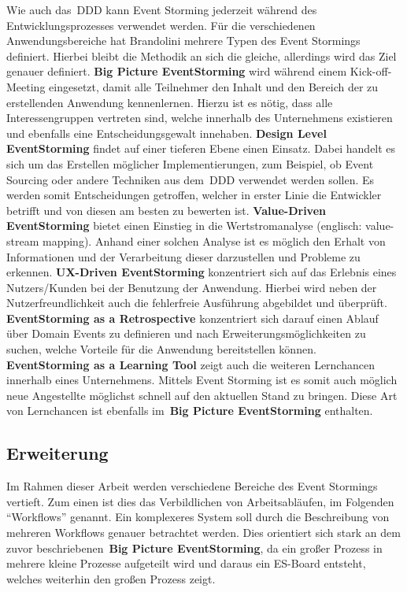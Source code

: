 Wie auch das~\ac{DDD} kann Event Storming jederzeit während des Entwicklungsprozesses verwendet werden.
Für die verschiedenen Anwendungsbereiche hat Brandolini mehrere Typen des Event Stormings definiert\cite*{introES}.
Hierbei bleibt die Methodik an sich die gleiche, allerdings wird das Ziel genauer definiert.\newline
\textbf{Big Picture EventStorming} wird während einem Kick-off-Meeting eingesetzt, damit alle Teilnehmer den Inhalt und den Bereich der zu erstellenden Anwendung kennenlernen.
Hierzu ist es nötig, dass alle Interessengruppen vertreten sind, welche innerhalb des Unternehmens existieren und ebenfalls eine Entscheidungsgewalt innehaben.\newline
\textbf{Design Level EventStorming} findet auf einer tieferen Ebene einen Einsatz.
Dabei handelt es sich um das Erstellen möglicher Implementierungen, zum Beispiel, ob Event Sourcing oder andere Techniken aus dem~\ac{DDD} verwendet werden sollen.
Es werden somit Entscheidungen getroffen, welcher in erster Linie die Entwickler betrifft und von diesen am besten zu bewerten ist.\newline
\textbf{Value-Driven EventStorming} bietet einen Einstieg in die Wertstromanalyse (englisch: value-stream mapping).
Anhand einer solchen Analyse ist es möglich den Erhalt von Informationen und der Verarbeitung dieser darzustellen und Probleme zu erkennen.\newline
\textbf{UX-Driven EventStorming} konzentriert sich auf das Erlebnis eines Nutzers/Kunden bei der Benutzung der Anwendung.
Hierbei wird neben der Nutzerfreundlichkeit auch die fehlerfreie Ausführung abgebildet und überprüft.\newline
\textbf{EventStorming as a Retrospective} konzentriert sich darauf einen Ablauf über Domain Events zu definieren und nach
Erweiterungsmöglichkeiten zu suchen, welche Vorteile für die Anwendung bereitstellen können.\newline
\textbf{EventStorming as a Learning Tool} zeigt auch die weiteren Lernchancen innerhalb eines Unternehmens.
Mittels Event Storming ist es somit auch möglich neue Angestellte möglichst schnell auf den aktuellen Stand zu bringen.
Diese Art von Lernchancen ist ebenfalls im~\textbf{Big Picture EventStorming} enthalten.

\subsection{Erweiterung}\label{subsec:erweiterung}
Im Rahmen dieser Arbeit werden verschiedene Bereiche des Event Stormings vertieft.
Zum einen ist dies das Verbildlichen von Arbeitsabläufen, im Folgenden ``Workflows'' genannt.
Ein komplexeres System soll durch die Beschreibung von mehreren Workflows genauer betrachtet werden.
Dies orientiert sich stark an dem zuvor beschriebenen~\textbf{Big Picture EventStorming}, da ein großer Prozess in mehrere kleine
Prozesse aufgeteilt wird und daraus ein \ac{ES}-Board entsteht, welches weiterhin den großen Prozess zeigt.

